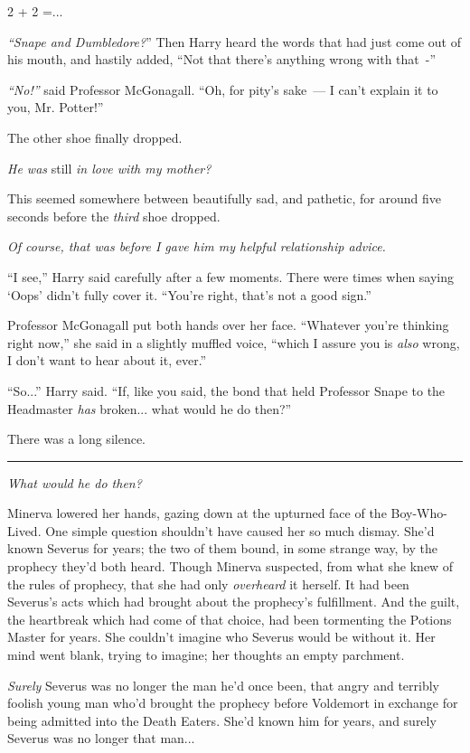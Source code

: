 2 + 2 =...

\emph{``Snape and Dumbledore?}'' Then Harry heard the words that had just come out of his mouth, and hastily added, ``Not that there's anything wrong with that~-''

\emph{``No!''} said Professor McGonagall. ``Oh, for pity's sake~--- I can't explain it to you, Mr. Potter!''

The other shoe finally dropped.

\emph{He was} still \emph{in love with my mother?}

This seemed somewhere between beautifully sad, and pathetic, for around five seconds before the \emph{third} shoe dropped.

\emph{Of course, that was before I gave him my helpful relationship advice.}

``I see,'' Harry said carefully after a few moments. There were times when saying `Oops' didn't fully cover it. ``You're right, that's not a good sign.''

Professor McGonagall put both hands over her face. ``Whatever you're thinking right now,'' she said in a slightly muffled voice, ``which I assure you is \emph{also} wrong, I don't want to hear about it, ever.''

``So...'' Harry said. ``If, like you said, the bond that held Professor Snape to the Headmaster \emph{has} broken... what would he do then?''

There was a long silence.

\begin{center}\rule{3in}{0.4pt}\end{center}

\emph{What would he do then?}

Minerva lowered her hands, gazing down at the upturned face of the Boy-Who-Lived. One simple question shouldn't have caused her so much dismay. She'd known Severus for years; the two of them bound, in some strange way, by the prophecy they'd both heard. Though Minerva suspected, from what she knew of the rules of prophecy, that she had only \emph{overheard} it herself. It had been Severus's acts which had brought about the prophecy's fulfillment. And the guilt, the heartbreak which had come of that choice, had been tormenting the Potions Master for years. She couldn't imagine who Severus would be without it. Her mind went blank, trying to imagine; her thoughts an empty parchment.

\emph{Surely} Severus was no longer the man he'd once been, that angry and terribly foolish young man who'd brought the prophecy before Voldemort in exchange for being admitted into the Death Eaters. She'd known him for years, and surely Severus was no longer that man...

